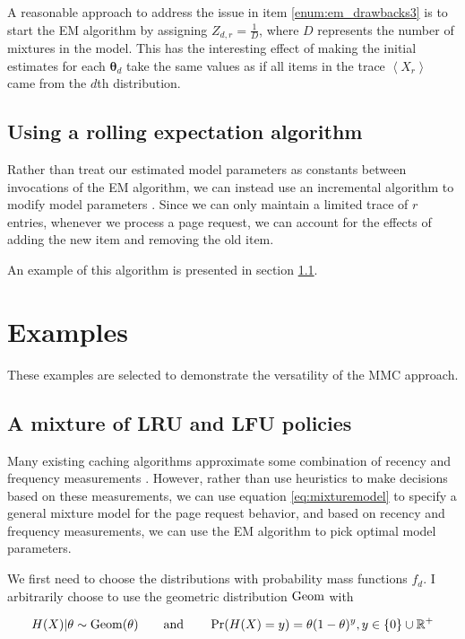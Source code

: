   A reasonable approach to address the issue in item
  \ref{enum:em_drawbacks3} is to start the EM algorithm by assigning $Z_{d, r}
  = \frac{1}{D}$, where $D$ represents the number of mixtures in the model. This
  has the interesting effect of making the initial estimates for each
  $\bm{\theta}_d$ take the same values as if all items in the trace
  $\left< X_r \right>$ came from the $d$th distribution.

\subsection{Using a rolling expectation algorithm}
\label{sec:using_rolling}
  Rather than treat our estimated model parameters as constants between
  invocations of the EM algorithm, we can instead use an incremental algorithm to
  modify model parameters \cite{neal1998view}. Since we can only maintain a
  limited trace of $r$ entries, whenever we process a page request, we can
  account for the effects of adding the new item and removing the old item.

  An example of this algorithm is presented in section
  \ref{sec:example_mix_lru_lfu}.

\section{Examples}
\label{sec:examples}
  These examples are selected to demonstrate the versatility of the MMC
  approach.

\subsection{A mixture of LRU and LFU policies}
\label{sec:example_mix_lru_lfu}
  Many existing caching algorithms approximate some combination of recency
  and frequency measurements \cite{arc, johnson1994x3, kim2001lrfu, o1993lru}.
  However, rather than use heuristics to make decisions based on these
  measurements, we can use equation \ref{eq:mixturemodel} to specify a general
  mixture model for the page request behavior, and based on recency and
  frequency measurements, we can use the EM algorithm to pick optimal model
  parameters.

  We first need to choose the distributions with probability mass functions
  $f_d$. I arbitrarily choose to use the geometric distribution $\operatorname*{\operatorname{Geom}}$ with

  \begin{equation}
    H(X) | \theta \sim \operatorname*{\operatorname{Geom}}(\theta)
  \qquad
  \mbox{and}
  \qquad
    \Pr(H(X) = y) = \theta (1 - \theta)^{y}, y \in \{0\} \cup \mathbb{R}^{+}
  \end{equation}

